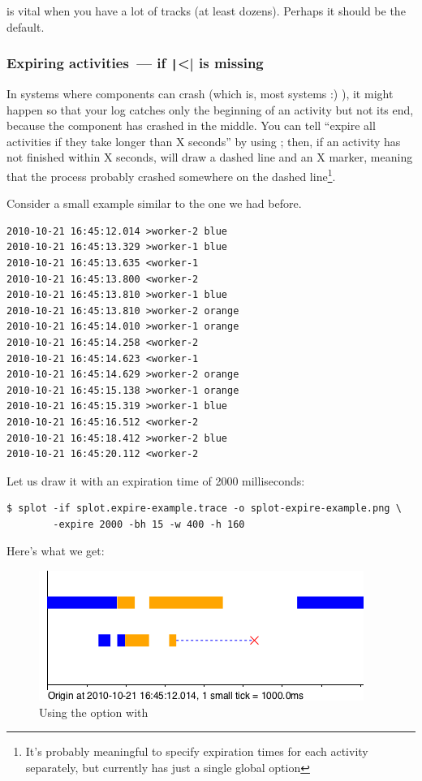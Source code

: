 \documentclass{article}
\begin{document}
 is vital when you have a lot of tracks (at least dozens). Perhaps it should be the default.

\subsubsection{Expiring activities~--- if \texttt|<| is missing}

In systems where components can crash (which is, most systems :) ), it might happen so that your log catches only the beginning of an activity but not its end, because the component has crashed in the middle. You can tell \splot{} ``expire all activities if they take longer than X seconds'' by using ; then, if an activity has not finished within X seconds, \splot{} will draw a dashed line and an X marker, meaning that the process probably crashed somewhere on the dashed line\footnote{It's probably meaningful to specify expiration times for each activity separately, but currently \splot{} has just a single global option}.

Consider a small example similar to the one we had before.

\begin{verbatim}
2010-10-21 16:45:12.014 >worker-2 blue
2010-10-21 16:45:13.329 >worker-1 blue
2010-10-21 16:45:13.635 <worker-1
2010-10-21 16:45:13.800 <worker-2
2010-10-21 16:45:13.810 >worker-1 blue
2010-10-21 16:45:13.810 >worker-2 orange
2010-10-21 16:45:14.010 >worker-1 orange
2010-10-21 16:45:14.258 <worker-2
2010-10-21 16:45:14.623 <worker-1
2010-10-21 16:45:14.629 >worker-2 orange
2010-10-21 16:45:15.138 >worker-1 orange
2010-10-21 16:45:15.319 >worker-1 blue
2010-10-21 16:45:16.512 <worker-2
2010-10-21 16:45:18.412 >worker-2 blue
2010-10-21 16:45:20.112 <worker-2
\end{verbatim}

Let us draw it with an expiration time of 2000 milliseconds:

\begin{verbatim}
$ splot -if splot.expire-example.trace -o splot-expire-example.png \
        -expire 2000 -bh 15 -w 400 -h 160
\end{verbatim}

Here's what we get:

\begin{figure}[h!]
\center
\includegraphics[scale=0.5]{pics/splot/splot-expire-example.png}
\caption{Using the \hlverb{-expire} option with \splot{}}
\end{figure}
\end{document}
